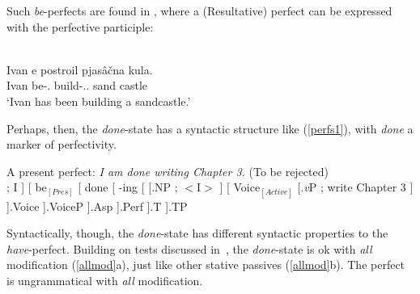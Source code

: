 \documentclass[output=paper]{langsci/langscibook}
\begin{document}
Such \emph{be}-perfects are found in , where a (Resultative)
perfect can be expressed with the perfective participle:

\begin{exe}
    \ex {}\\
    \gll  Ivan e postroil pjas\^{a}\v{c}na kula. \\
    Ivan be-\Tsg.\Prs{} build-\Prf.\M.\Sg{} sand castle \\
    \trans `Ivan has been building a sandcastle.' \hfill{\citep[296]{Pancheva2003a}}
\end{exe}

Perhaps, then, the \emph{done}-state has a syntactic structure like
(\ref{perfs1}), with \emph{done} a marker of perfectivity.

\begin{exe}
\ex A present perfect: {\em I am done writing Chapter 3.} (To be
rejected)\label{perfs1}\\
\vspace{12pt}
    \Tree
        [
            [.NP \edge[roof]; {I} ]
            [
                be$_{[Pres]}$
                [
                    done
                    [
                        -ing
                        [
                            [.NP \edge[roof]; {$<$I$>$} ]
                            [
                                Voice$_{[Active]}$
                                [.\emph{v}P \edge[roof]; {write Chapter 3} ]
                            ].Voice
                        ].VoiceP
                    ].Asp
                ].Perf
            ].T
        ].TP
\end{exe}

Syntactically, though, the \emph{done}-state has different syntactic properties
to the  \emph{have}-perfect. Building on tests discussed
in~\cite{Fruehwald2015a}, the \emph{done}-state is ok with {\em all}
modification (\ref{allmod}a), just like other stative passives (\ref{allmod}b).
The perfect is ungrammatical with {\em all} modification.

\begin{exe}
\ex\label{allmod}
\begin{xlist}
\end{xlist}
\end{exe}
\end{document}
